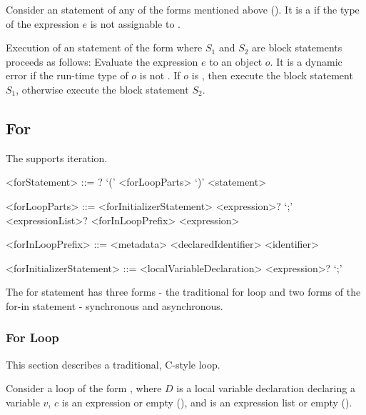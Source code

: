 \documentclass[makeidx]{article}
\begin{document}
\LMHash{}%
Consider an \IF{} statement of any of the forms mentioned above
().
It is a  if the type of the expression $e$
is not assignable to .

\LMHash{}%
Execution of an \IF{} statement of the form
where $S_1$ and $S_2$ are block statements
proceeds as follows:
Evaluate the expression $e$ to an object $o$.
It is a dynamic error if the run-time type of $o$ is not .
If $o$ is \TRUE, then execute the block statement $S_1$,
otherwise execute the block statement $S_2$.


\subsection{For}

\LMHash{}%
The  supports iteration.

\begin{grammar}
<forStatement> ::= \AWAIT? \FOR{} `(' <forLoopParts> `)' <statement>

<forLoopParts> ::= <forInitializerStatement> <expression>? `;' <expressionList>?
  \alt <forInLoopPrefix> \IN{} <expression>

<forInLoopPrefix> ::= <metadata> <declaredIdentifier>
  \alt <identifier>

<forInitializerStatement> ::= <localVariableDeclaration>
  \alt <expression>? `;'
\end{grammar}

\LMHash{}%
The for statement has three forms - the traditional for loop
and two forms of the for-in statement - synchronous and asynchronous.


\subsubsection{For Loop}

\LMHash{}%
This section describes a traditional, C-style \FOR{} loop.

\LMHash{}%
Consider a loop of the form
,
where $D$ is a local variable declaration declaring a variable $v$,
$c$ is an expression or empty
(),
and  is an expression list or empty
().
\end{document}
